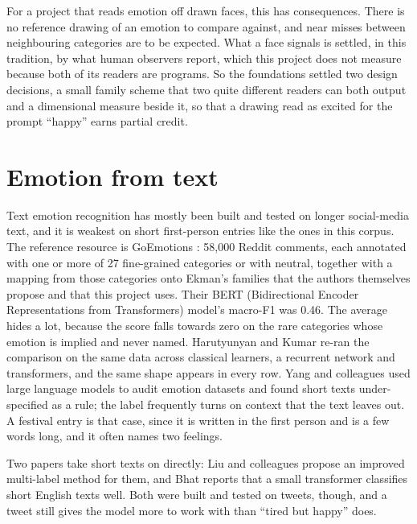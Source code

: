 For a project that reads emotion off drawn faces, this has consequences. There is no reference drawing of an emotion to compare against, and near misses between neighbouring categories are to be expected. What a face signals is settled, in this tradition, by what human observers report, which this project does not measure because both of its readers are programs. So the foundations settled two design decisions, a small family scheme that two quite different readers can both output and a dimensional measure beside it, so that a drawing read as excited for the prompt ``happy'' earns partial credit.

\section{Emotion from text}
\label{sec:lit-text}

Text emotion recognition has mostly been built and tested on longer social-media text, and it is weakest on short first-person entries like the ones in this corpus. The reference resource is GoEmotions \cite{demszky2020goemotions}: 58,000 Reddit comments, each annotated with one or more of 27 fine-grained categories or with neutral, together with a mapping from those categories onto Ekman's families that the authors themselves propose and that this project uses. Their BERT (Bidirectional Encoder Representations from Transformers) model's macro-F1 was 0.46. The average hides a lot, because the score falls towards zero on the rare categories whose emotion is implied and never named. Harutyunyan and Kumar \cite{harutyunyan2026fine} re-ran the comparison on the same data across classical learners, a recurrent network and transformers, and the same shape appears in every row. Yang and colleagues \cite{yang2023context} used large language models to audit emotion datasets and found short texts under-specified as a rule; the label frequently turns on context that the text leaves out. A festival entry is that case, since it is written in the first person and is a few words long, and it often names two feelings.

Two papers take short texts on directly: Liu and colleagues \cite{liu2023emotion} propose an improved multi-label method for them, and Bhat \cite{bhat2024emotion} reports that a small transformer classifies short English texts well. Both were built and tested on tweets, though, and a tweet still gives the model more to work with than ``tired but happy'' does.

